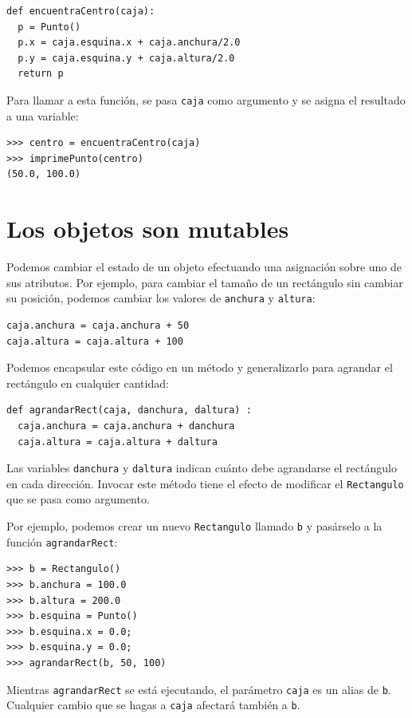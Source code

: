 \beforeverb
\begin{verbatim}
def encuentraCentro(caja):
  p = Punto()
  p.x = caja.esquina.x + caja.anchura/2.0
  p.y = caja.esquina.y + caja.altura/2.0
  return p
\end{verbatim}
\afterverb
%
Para llamar a esta función, se pasa \texttt{caja} como argumento y se asigna el resultado
a una variable:

\beforeverb
\begin{verbatim}
>>> centro = encuentraCentro(caja)
>>> imprimePunto(centro)
(50.0, 100.0)
\end{verbatim}
\afterverb
%

\section{Los objetos son mutables}

Podemos cambiar el estado de un objeto efectuando una asignación
sobre uno de sus atributos. Por ejemplo, para cambiar el tamaño de
un rectángulo sin cambiar su posición, podemos cambiar los valores de
\texttt{anchura} y \texttt{altura}:

\beforeverb
\begin{verbatim}
caja.anchura = caja.anchura + 50
caja.altura = caja.altura + 100
\end{verbatim}
\afterverb
%
Podemos encapsular este código en un método y generalizarlo
para agrandar el rectángulo en cualquier cantidad:


\beforeverb
\begin{verbatim}
def agrandarRect(caja, danchura, daltura) :
  caja.anchura = caja.anchura + danchura
  caja.altura = caja.altura + daltura
\end{verbatim}
\afterverb
%
Las variables \texttt{danchura} y \texttt{daltura} indican cuánto debe agrandarse
el rectángulo en cada dirección. Invocar este método tiene el efecto de
modificar el \texttt{Rectangulo} que se pasa como argumento.

Por ejemplo, podemos crear un nuevo \texttt{Rectangulo} llamado \texttt{b}
y pasárselo a la función \texttt{agrandarRect}:

\beforeverb
\begin{verbatim}
>>> b = Rectangulo()
>>> b.anchura = 100.0
>>> b.altura = 200.0
>>> b.esquina = Punto()
>>> b.esquina.x = 0.0;
>>> b.esquina.y = 0.0;
>>> agrandarRect(b, 50, 100)
\end{verbatim}
\afterverb
%
Mientras \texttt{agrandarRect} se está ejecutando, el parámetro \texttt{caja} es un
alias de \texttt{b}. Cualquier cambio que se hagas a \texttt{caja} afectará también a
\texttt{b}.

